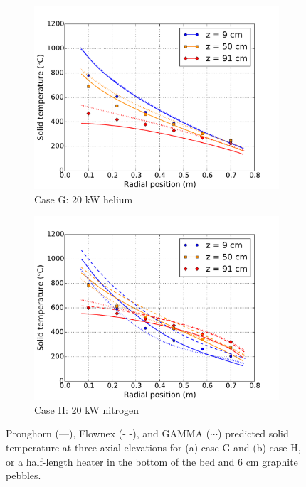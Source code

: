 \begin{figure}[h!]
    \begin{subfigure}{0.5\linewidth}
        \centering
        \includegraphics[height=0.75\linewidth]{figs/exp_total_U2.pdf}
       \caption{Case G: 20 \si{\kilo\watt} helium}
    \end{subfigure}
    \begin{subfigure}{0.5\linewidth}
        \centering
        \includegraphics[height=0.75\linewidth]{figs/exp_total_Y2.pdf}
        \caption{Case H: 20 \si{\kilo\watt} nitrogen}
    \end{subfigure}
    \caption{Pronghorn (---), Flownex (- -), and GAMMA (\(\cdots\)) predicted solid temperature at three axial elevations for (a) case G and (b) case H, or a half-length heater in the bottom of the bed and 6 \si{\centi\meter} graphite pebbles.}
    \label{fig:bottom}
\end{figure}

